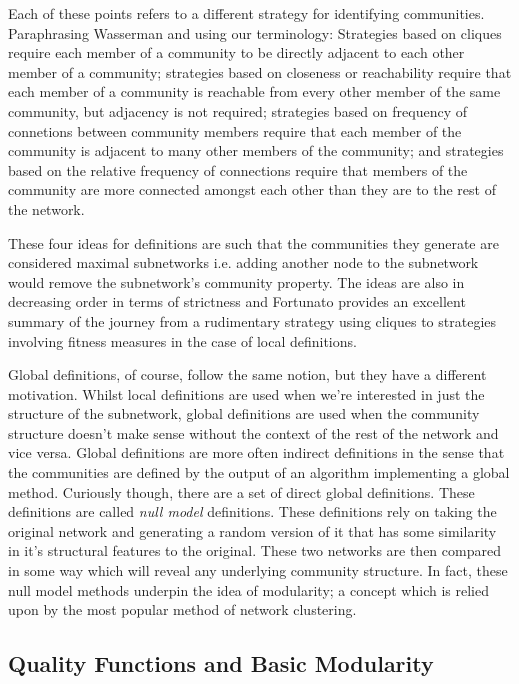 Each of these points refers to a different strategy for identifying communities. Paraphrasing Wasserman and using our terminology: Strategies based on cliques require each member of a community to be directly adjacent to each other member of a community; strategies based on closeness or reachability require that each member of a community is reachable from every other member of the same community, but adjacency is not required; strategies based on frequency of connetions between community members require that each member of the community is adjacent to many other members of the community; and strategies based on the relative frequency of connections require that members of the community are more connected amongst each other than they are to the rest of the network.

These four ideas for definitions are such that the communities they generate are considered maximal subnetworks i.e. adding another node to the subnetwork would remove the subnetwork's community property. The ideas are also in decreasing order in terms of strictness and Fortunato provides an excellent summary of the journey from a rudimentary strategy using cliques to strategies involving fitness measures in the case of local definitions.\cite[88-90]{fortunato}

Global definitions, of course, follow the same notion, but they have a different motivation. Whilst local definitions are used when we're interested in just the structure of the subnetwork, global definitions are used when the community structure doesn't make sense without the context of the rest of the network and vice versa. Global definitions are more often indirect definitions in the sense that the communities are defined by the output of an algorithm implementing a global method. Curiously though, there are a set of direct global definitions. These definitions are called \emph{null model} definitions. These definitions rely on taking the original network and generating a random version of it that has some similarity in it's structural features to the original. These two networks are then compared in some way which will reveal any underlying community structure. In fact, these null model methods underpin the idea of modularity; a concept which is relied upon by the most popular method of network clustering.

\subsection{Quality Functions and Basic Modularity}\label{sec:qfs and modularity}

